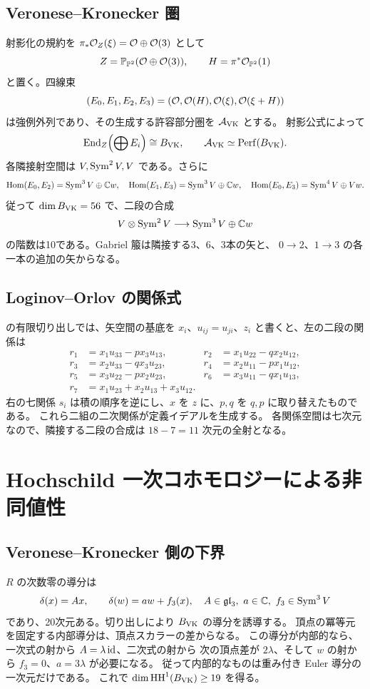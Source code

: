 \subsection{Veronese--Kronecker 圏}
射影化の規約を $\pi_*\mathcal O_Z(\xi)=\mathcal O\oplus\mathcal O(3)$ として
\[
 Z=\mathbb P_{\mathbb P^2}(\mathcal O\oplus\mathcal O(3)),\qquad H=\pi^*\mathcal O_{\mathbb P^2}(1)
\]
と置く。四線束
\[
 (E_0,E_1,E_2,E_3)=(\mathcal O,\mathcal O(H),\mathcal O(\xi),\mathcal O(\xi+H))
\]
は強例外列であり、その生成する許容部分圏を $\mathcal A_{\mathrm{VK}}$ とする。
射影公式によって
\[
 \operatorname{End}_Z\Bigl(\bigoplus E_i\Bigr)\cong B_{\mathrm{VK}},
 \qquad\mathcal A_{\mathrm{VK}}\simeq\operatorname{Perf}(B_{\mathrm{VK}}).
\]
各隣接射空間は $V,\operatorname{Sym}^2V,V$ である。さらに
\[
 \operatorname{Hom}(E_0,E_2)=\operatorname{Sym}^3V\oplus\mathbb C w,
 \quad \operatorname{Hom}(E_1,E_3)=\operatorname{Sym}^3V\oplus\mathbb C w,
 \quad \operatorname{Hom}(E_0,E_3)=\operatorname{Sym}^4V\oplus Vw.
\]
従って $\dim B_{\mathrm{VK}}=56$ で、二段の合成
\begin{equation}\label{eq:rank10}
 V\otimes\operatorname{Sym}^2V\longrightarrow\operatorname{Sym}^3V\oplus\mathbb C w
\end{equation}
の階数は10である。Gabriel 箙は隣接する3、6、3本の矢と、
$0\to2$、$1\to3$ の各一本の追加の矢からなる。

\subsection{Loginov--Orlov の関係式}
\cite[Section 2]{LO} の有限切り出しでは、矢空間の基底を
$x_i$、$u_{ij}=u_{ji}$、$z_i$ と書くと、左の二段の関係は
\begin{align*}
r_1&=x_1u_{33}-p x_3u_{13},&r_2&=x_1u_{22}-q x_2u_{12},\\
r_3&=x_2u_{33}-q x_3u_{23},&r_4&=x_2u_{11}-p x_1u_{12},\\
r_5&=x_3u_{22}-p x_2u_{23},&r_6&=x_3u_{11}-q x_1u_{13},\\
r_7&=x_1u_{23}+x_2u_{13}+x_3u_{12}.
\end{align*}
右の七関係 $s_i$ は積の順序を逆にし、$x$ を $z$ に、$p,q$ を
$q,p$ に取り替えたものである。
これら二組の二次関係が定義イデアルを生成する。
各関係空間は七次元なので、隣接する二段の合成は
$18-7=11$ 次元の全射となる。

\section{Hochschild 一次コホモロジーによる非同値性}
\subsection{Veronese--Kronecker 側の下界}
$R$ の次数零の導分は
\[
 \delta(x)=Ax,\qquad\delta(w)=a w+f_3(x),
 \quad A\in\mathfrak{gl}_3,\ a\in\mathbb C,\ f_3\in\operatorname{Sym}^3V
\]
であり、20次元ある。切り出しにより $B_{\mathrm{VK}}$ の導分を誘導する。
頂点の冪等元を固定する内部導分は、頂点スカラーの差からなる。
この導分が内部的なら、一次式の射から $A=\lambda\operatorname{id}$、二次式の射から
次の頂点差が $2\lambda$、そして $w$ の射から
$f_3=0$、$a=3\lambda$ が必要になる。
従って内部的なものは重み付き Euler 導分の一次元だけである。
これで $\dim\operatorname{HH}^1(B_{\mathrm{VK}})\ge19$ を得る。


